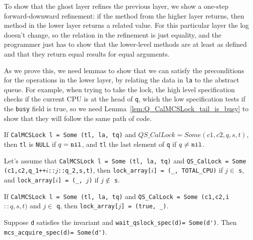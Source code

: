 To show that the ghost layer refines the previous layer, we show a
one-step forward-downward refinement: if the method from the higher
layer returns, then method in the lower layer returns a related
value. For this particular layer the log doesn't change, so the
relation in the refinement is just equality, and the programmer just
has to show that the lower-level methods are at least as defined and
that they return equal results for equal arguments.


As we prove this, we need lemmas to show that we can satisfy the preconditions for the operations in the lower layer, by relating the data in \lstinline$la$ to the abstract queue.  For example, when trying to take the lock, the high level specification checks if the current CPU is at the head of \lstinline$q$, which the low specification tests if the \lstinline$busy$ field is true, so we need Lemma~\ref{lem:Q_CalMCSLock_tail_is_busy} to show that they will follow the same path of code. 

\begin{lemma}
If \lstinline$CalMCSLock l = Some (tl, la, tq)$ and $QS\_CalLock = Some (c1,c2,q,s,t)$, then \lstinline$tl$ is \texttt{NULL} if $q = \mathrm{\texttt{nil}}$, and \lstinline$tl$ the last element of \lstinline$q$ if $q \neq \mathrm{\texttt{nil}}$.
\end{lemma}

\begin{lemma}
Let's assume that \lstinline$CalMCSLock l = Some (tl, la, tq)$ and \lstinline$QS_CalLock = Some (c1,c2,q_1++$$i$\lstinline$::$$j$\lstinline$::q_2,s,t)$, then \lstinline$lock_array[$$i$\lstinline$] = (_, TOTAL_CPU)$ if $j \in $ \lstinline$s$, and 
\lstinline$lock_array[$$i$\lstinline$] = (_, $$j$\lstinline$)$ if $j \not\in$ \lstinline$s$.
\end{lemma}

\begin{lemma}
\label{lem:Q_CalMCSLock_tail_is_busy}
If \lstinline$CalMCSLock l = Some (tl, la, tq)$ and \lstinline$QS_CalLock = Some (c1,c2,$\lstinline$i$$::q,s,t)$ and $j \in$ \lstinline$q$, then \lstinline$lock_array[$$j$\lstinline$] = (true, _)$.
\end{lemma}

\begin{theorem} Suppose \lstinline$d$ satisfies the invariant and
\lstinline$wait_qslock_spec(d)= Some(d')$. Then \lstinline$mcs_acquire_spec(d)= Some(d')$.
\end{theorem}


